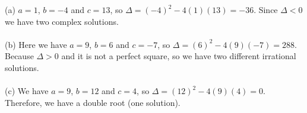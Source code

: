 (a) $a=1$, $b=-4$ and $c=13$, so $\Delta=(-4)^2-4(1)(13)=-36$. Since $\Delta<0$ we have
two complex solutions.\\
\\(b) Here we have $a=9$, $b=6$ and $c=-7$, so $\Delta=(6)^2-4(9)(-7)=288$. Because $\Delta>0$ 
and it is not a perfect square, so we have two different irrational solutions.\\
\\(c) We have $a=9$, $b=12$ and $c=4$, so $\Delta=(12)^2-4(9)(4)=0$. Therefore, we have a double
root (one solution).